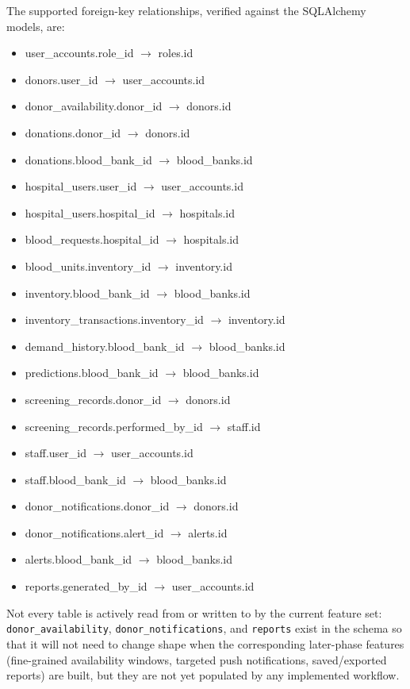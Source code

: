 \documentclass[12pt,twoside]{report}
\begin{document}
The supported foreign-key relationships, verified against the SQLAlchemy models, are:

\begin{itemize}[itemsep=0pt]
\item user\_accounts.role\_id $\rightarrow$ roles.id
\item donors.user\_id $\rightarrow$ user\_accounts.id
\item donor\_availability.donor\_id $\rightarrow$ donors.id
\item donations.donor\_id $\rightarrow$ donors.id
\item donations.blood\_bank\_id $\rightarrow$ blood\_banks.id
\item hospital\_users.user\_id $\rightarrow$ user\_accounts.id
\item hospital\_users.hospital\_id $\rightarrow$ hospitals.id
\item blood\_requests.hospital\_id $\rightarrow$ hospitals.id
\item blood\_units.inventory\_id $\rightarrow$ inventory.id
\item inventory.blood\_bank\_id $\rightarrow$ blood\_banks.id
\item inventory\_transactions.inventory\_id $\rightarrow$ inventory.id
\item demand\_history.blood\_bank\_id $\rightarrow$ blood\_banks.id
\item predictions.blood\_bank\_id $\rightarrow$ blood\_banks.id
\item screening\_records.donor\_id $\rightarrow$ donors.id
\item screening\_records.performed\_by\_id $\rightarrow$ staff.id
\item staff.user\_id $\rightarrow$ user\_accounts.id
\item staff.blood\_bank\_id $\rightarrow$ blood\_banks.id
\item donor\_notifications.donor\_id $\rightarrow$ donors.id
\item donor\_notifications.alert\_id $\rightarrow$ alerts.id
\item alerts.blood\_bank\_id $\rightarrow$ blood\_banks.id
\item reports.generated\_by\_id $\rightarrow$ user\_accounts.id
\end{itemize}

Not every table is actively read from or written to by the current feature set: \texttt{donor\_availability}, \texttt{donor\_notifications}, and \texttt{reports} exist in the schema so that it will not need to change shape when the corresponding later-phase features (fine-grained availability windows, targeted push notifications, saved/exported reports) are built, but they are not yet populated by any implemented workflow.
\end{document}
